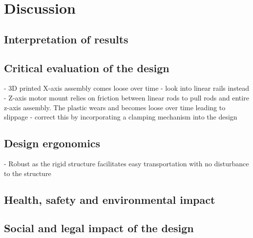 
\section{Discussion}

\subsection{Interpretation of results}

\subsection{Critical evaluation of the design}

- 3D printed X-axis assembly comes loose over time - look into linear rails instead
- Z-axis motor mount relies on friction between linear rods to pull rods and entire z-axis assembly. The plastic wears and becomes loose over time leading to slippage - correct this by incorporating a clamping mechanism into the design

\subsection{Design ergonomics}

- Robust as the rigid structure facilitates easy transportation with no disturbance to the structure

\subsection{Health, safety and environmental impact}

\subsection{Social and legal impact of the design}


\newpage



